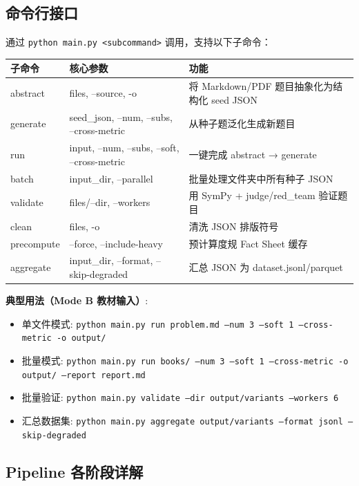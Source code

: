 \documentclass[11pt,a4paper]{article}
\begin{document}
\subsection{命令行接口}

通过 \texttt{python main.py <subcommand>} 调用，支持以下子命令：

\begin{table}[h]\centering\small
\begin{tabular}{llp{6.5cm}}
\toprule
\textbf{子命令} & \textbf{核心参数} & \textbf{功能} \\
\midrule
abstract & files, --source, -o & 将 Markdown/PDF 题目抽象化为结构化 seed JSON \\
generate & seed\_json, --num, --subs, --cross-metric & 从种子题泛化生成新题目 \\
run & input, --num, --subs, --soft, --cross-metric & 一键完成 abstract → generate \\
batch & input\_dir, --parallel & 批量处理文件夹中所有种子 JSON \\
validate & files/--dir, --workers & 用 SymPy + judge/red\_team 验证题目 \\
clean & files, -o & 清洗 JSON 排版符号 \\
precompute & --force, --include-heavy & 预计算度规 Fact Sheet 缓存 \\
aggregate & input\_dir, --format, --skip-degraded & 汇总 JSON 为 dataset.jsonl/parquet \\
\bottomrule
\end{tabular}
\end{table}

\small\noindent
\textbf{典型用法（Mode B 教材输入）}:
\begin{itemize}[nosep]
  \item 单文件模式: \texttt{python main.py run problem.md --num 3 --soft 1 --cross-metric -o output/}
  \item 批量模式: \texttt{python main.py run books/ --num 3 --soft 1 --cross-metric -o output/ --report report.md}
  \item 批量验证: \texttt{python main.py validate --dir output/variants --workers 6}
  \item 汇总数据集: \texttt{python main.py aggregate output/variants --format jsonl --skip-degraded}
\end{itemize}

\subsection{Pipeline 各阶段详解}
\end{document}
